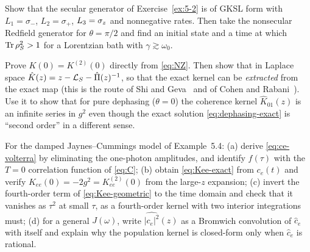 \begin{exercise}\label{ex:5-3}
Show that the secular generator of Exercise~\ref{ex:5-2} is of GKSL form with $L_1=\sigma_-$, $L_2=\sigma_+$, $L_3=\sigma_z$ and nonnegative rates.
Then take the nonsecular Redfield generator for $\theta=\pi/2$ and find an initial state and a time at which $\operatorname{Tr}\rho_{S}^2>1$ for a Lorentzian bath with $\gamma\gtrsim\omega_0$.
\end{exercise}

\begin{exercise}\label{ex:5-4}
Prove $K(0)=K^{(2)}(0)$ directly from \cref{eq:NZ}.
Then show that in Laplace space $\hat K(z)=z-\mathcal{L}_S-\hat\Pi(z)^{-1}$, so that the exact kernel can be \emph{extracted} from the exact map (this is the route of Shi and Geva~\cite{ShiGeva2003} and of Cohen and Rabani~\cite{CohenRabani2011}).
Use it to show that for pure dephasing ($\theta=0$) the coherence kernel $\hat K_{01}(z)$ is an infinite series in $g^2$ even though the exact solution \eqref{eq:dephasing-exact} is ``second order'' in a different sense.
\end{exercise}

\begin{exercise}\label{ex:5-5}
For the damped Jaynes--Cummings model of Example~5.4: (a) derive \cref{eq:ce-volterra} by eliminating the one-photon amplitudes, and identify $f(\tau)$ with the $T=0$ correlation function of \cref{eq:C}; (b) obtain \cref{eq:Kee-exact} from $c_e(t)$ and verify $K_{ee}(0)=-2g^2=K^{(2)}_{ee}(0)$ from the large-$z$ expansion; (c) invert the fourth-order term of \cref{eq:Kee-geometric} to the time domain and check that it vanishes as $\tau^2$ at small $\tau$, as a fourth-order kernel with two interior integrations must; (d) for a general $J(\omega)$, write $\widehat{|c_e|^2}(z)$ as a Bromwich convolution of $\hat c_e$ with itself and explain why the population kernel is closed-form only when $\hat c_e$ is rational.
\end{exercise}

\clearpage
